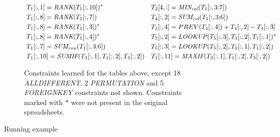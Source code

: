 \begin{figure}[thb]
\begin{subfigure}{1\textwidth}
{\begin{align*}
      &~\ecrank{\range{T_{1}}{\rangeall}{1}}{\range{T_{1}}{\rangeall}{10}}^*    && \ecaggc{\textit{MIN}}{\range{T_{2}}{4}{\rangeall}}{\range{T_{1}}{\rangeall}{\rangeto{3}{7}}} \\
      &~\ecrank{\range{T_{1}}{\rangeall}{8}}{\range{T_{1}}{\rangeall}{7}}       && \ecsumc{\range{T_{4}}{\rangeall}{2}}{\range{T_{1}}{\rangeall}{\rangeto{3}{6}}} \\
      &~\ecrank{\range{T_{1}}{\rangeall}{8}}{\range{T_{1}}{\rangeall}{3}}^*     && \range{T_{4}}{\rangeall}{4} = PREV(\range{T_{4}}{\rangeall}{4}) + \range{T_{4}}{\rangeall}{2} - \range{T_{4}}{\rangeall}{3} \\
      &~\ecrank{\range{T_{1}}{\rangeall}{8}}{\range{T_{1}}{\rangeall}{4}}^*    && \eclookup{\range{T_{5}}{\rangeall}{2}}{\range{T_{5}}{\rangeall}{3}}{\range{T_{1}}{\rangeall}{2}}{\range{T_{1}}{\rangeall}{1}}^*\\
%
      &~\ecsumr{\range{T_{1}}{\rangeall}{7}}{\range{T_{1}}{\rangeall}{\rangeto{3}{6}}}   && \eclookup{\range{T_{5}}{\rangeall}{3}}{\range{T_{5}}{\rangeall}{2}}{\range{T_{1}}{\rangeall}{1}}{\range{T_{1}}{\rangeall}{2}} \\
%
      &~\ecaggif{\textit{SUM}}{\range{T_{1}}{\rangeall}{10}}{\range{T_{3}}{\rangeall}{1}}{\range{T_{1}}{\rangeall}{2}}{\range{T_{3}}{\rangeall}{2}}   && \ecaggif{\textit{MAX}}{\range{T_{1}}{\rangeall}{11}}{\range{T_{3}}{\rangeall}{1}}{\range{T_{1}}{\rangeall}{2}}{\range{T_{3}}{\rangeall}{2}} 
%
%
%
%
%
%
%
%
    \end{align*}}
  \vspace{-10pt}
  \caption{Constraints learned for the tables above, except 18 \textit{ALLDIFFERENT}, 2 \textit{PERMUTATION} and 5 \textit{FOREIGNKEY} constraints not shown.
  Constraints marked with $*$ were not present in the original spreadsheets.}
  \label{fig:sol_example}
\end{subfigure}
  \caption{Running example}
\end{figure}


